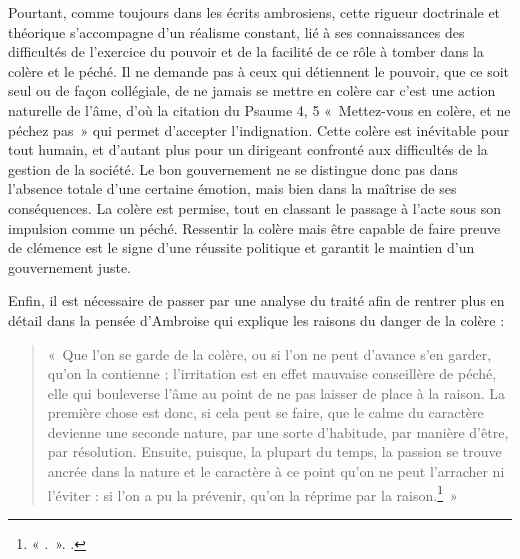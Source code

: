 \bigskip

Pourtant, comme toujours dans les écrits ambrosiens, cette rigueur doctrinale et théorique s'accompagne d'un réalisme constant, lié à ses connaissances des difficultés de l'exercice du pouvoir et de la facilité de ce rôle à tomber dans la colère et le péché. Il ne demande pas à ceux qui détiennent le pouvoir, que ce soit seul ou de façon collégiale, de ne jamais se mettre en colère car c'est une action naturelle de l'âme, d'où la citation du Psaume 4, 5 «~Mettez-vous en colère, et ne péchez pas~» qui permet d'accepter l'indignation. Cette colère est inévitable pour tout humain, et d'autant plus pour un dirigeant confronté aux difficultés de la gestion de la société. Le bon gouvernement ne se distingue donc pas dans l'absence totale d'une certaine émotion, mais bien dans la maîtrise de ses conséquences. La colère est permise, tout en classant le passage à l'acte sous son impulsion comme un péché. Ressentir la colère mais être capable de faire preuve de clémence est le signe d'une réussite politique et garantit le maintien d'un gouvernement juste.

\bigskip

Enfin, il est nécessaire de passer par une analyse du traité  afin de rentrer plus en détail dans la pensée d'Ambroise qui explique les raisons du danger de la colère :

\bigskip

\begin{quote}
    «~Que l'on se garde de la colère, ou si l'on ne peut d'avance s'en garder, qu'on la contienne ; l'irritation est en effet mauvaise conseillère de péché, elle qui bouleverse l'âme au point de ne pas laisser de place à la raison. La première chose est donc, si cela peut se faire, que le calme du caractère devienne une seconde nature, par une sorte d'habitude, par manière d'être, par résolution. Ensuite, puisque, la plupart du temps, la passion se trouve ancrée dans la nature et le caractère à ce point qu'on ne peut l'arracher ni l'éviter : si l'on a pu la prévenir, qu'on la réprime par la raison.\footnote{« .~». \cite[\nopp I, 90]{ambroise_devoirs_1}.}~»
\end{quote}

